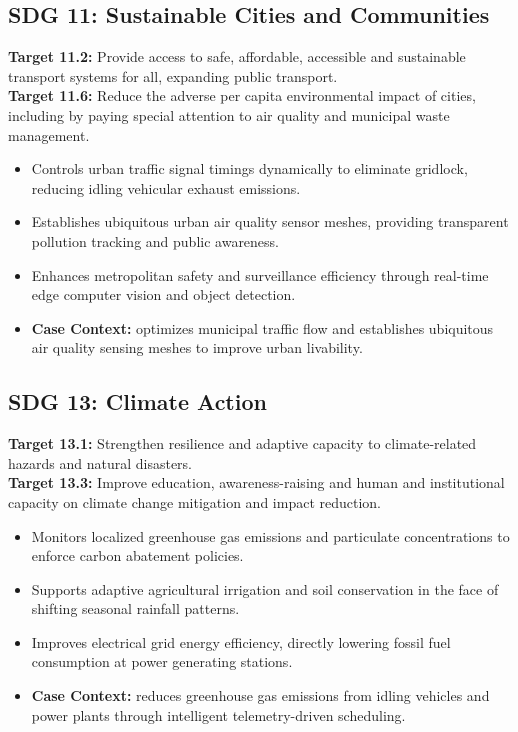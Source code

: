 \subsection{SDG 11: Sustainable Cities and Communities}
\noindent\textbf{Target 11.2:} Provide access to safe, affordable, accessible and sustainable transport systems for all, expanding public transport. \\
\noindent\textbf{Target 11.6:} Reduce the adverse per capita environmental impact of cities, including by paying special attention to air quality and municipal waste management.
\begin{itemize}
  \item Controls urban traffic signal timings dynamically to eliminate gridlock, reducing idling vehicular exhaust emissions.
  \item Establishes ubiquitous urban air quality sensor meshes, providing transparent pollution tracking and public awareness.
  \item Enhances metropolitan safety and surveillance efficiency through real-time edge computer vision and object detection.
  \item \textbf{Case Context:} optimizes municipal traffic flow and establishes ubiquitous air quality sensing meshes to improve urban livability.
\end{itemize}

\subsection{SDG 13: Climate Action}
\noindent\textbf{Target 13.1:} Strengthen resilience and adaptive capacity to climate-related hazards and natural disasters. \\
\noindent\textbf{Target 13.3:} Improve education, awareness-raising and human and institutional capacity on climate change mitigation and impact reduction.
\begin{itemize}
  \item Monitors localized greenhouse gas emissions and particulate concentrations to enforce carbon abatement policies.
  \item Supports adaptive agricultural irrigation and soil conservation in the face of shifting seasonal rainfall patterns.
  \item Improves electrical grid energy efficiency, directly lowering fossil fuel consumption at power generating stations.
  \item \textbf{Case Context:} reduces greenhouse gas emissions from idling vehicles and power plants through intelligent telemetry-driven scheduling.
\end{itemize}

